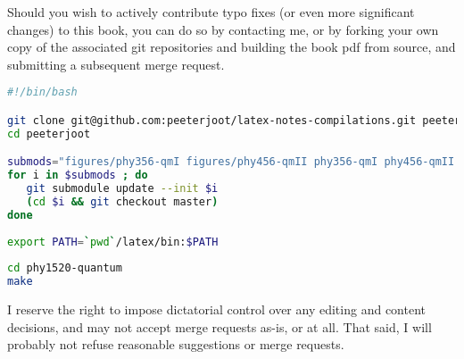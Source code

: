 %
%

Should you wish to actively contribute typo fixes (or even more significant changes) to this book, you can do so by contacting me, or by forking your own copy of the associated git repositories and building the book pdf from source, and submitting a subsequent merge request.

\begin{lstlisting}[language=bash]
#!/bin/bash

git clone git@github.com:peeterjoot/latex-notes-compilations.git peeterjoot
cd peeterjoot

submods="figures/phy356-qmI figures/phy456-qmII phy356-qmI phy456-qmII figures/phy1520-quantum phy1520-quantum julia mathematica latex"
for i in $submods ; do
   git submodule update --init $i
   (cd $i && git checkout master)
done
 
export PATH=`pwd`/latex/bin:$PATH
 
cd phy1520-quantum
make
\end{lstlisting}

I reserve the right to impose dictatorial control over any editing and content decisions, and may not accept merge requests as-is, or at all. That said, I will probably not refuse reasonable suggestions or merge requests.
